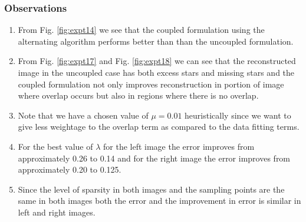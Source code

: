 \subsubsection{Observations}
\begin{enumerate}

\item From Fig. \ref{fig:expt14} we see that the coupled formulation using the alternating algorithm performs better than than the uncoupled formulation. 
\item From Fig. \ref{fig:expt17} and Fig. \ref{fig:expt18} we can see that the reconstructed image in the uncoupled case has both excess stars and missing stars and the coupled formulation not only improves reconstruction in portion of image where overlap occurs but also in regions where there is no overlap.
\item Note that we have a chosen value of $\mu = 0.01$ heuristically since we want to give less weightage to the overlap term as compared to the data fitting terms. 
\item For the best value of $\lambda$ for the left image the error improves from approximately 0.26 to 0.14 and for the right image the error improves from approximately 0.20 to 0.125.
\item Since the level of sparsity in both images and the sampling points are the same in both images both the error and the improvement in error is similar in left and right images.
\end{enumerate}

